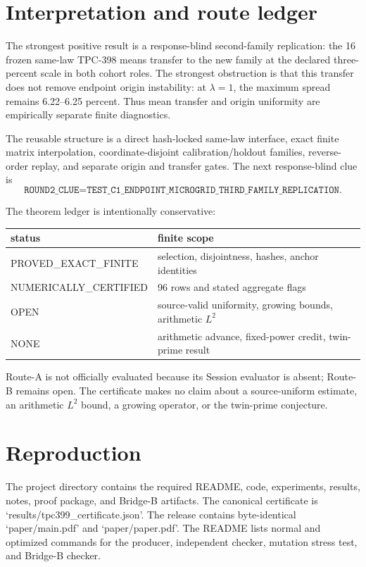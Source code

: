 \documentclass[10pt]{article}
\begin{document}
\section{Interpretation and route ledger}

The strongest positive result is a response-blind second-family replication:
the 16 frozen same-law TPC-398 means transfer to the new family at the
declared three-percent scale in both cohort roles.  The strongest obstruction
is that this transfer does not remove endpoint origin instability: at
$\lambda=1$, the maximum spread remains 6.22--6.25 percent.  Thus mean
transfer and origin uniformity are empirically separate finite diagnostics.

The reusable structure is a direct hash-locked same-law interface, exact finite
matrix interpolation, coordinate-disjoint calibration/holdout families,
reverse-order replay, and separate origin and transfer gates.  The next
response-blind clue is
\[
 \texttt{ROUND2\_CLUE=TEST\_C1\_ENDPOINT\_MICROGRID\_THIRD\_FAMILY\_REPLICATION}.
\]

The theorem ledger is intentionally conservative:
\begin{center}
\begin{tabular}{@{}ll@{}}
\toprule
status & finite scope\\
\midrule
PROVED\_EXACT\_FINITE & selection, disjointness, hashes, anchor identities\\
NUMERICALLY\_CERTIFIED & 96 rows and stated aggregate flags\\
OPEN & source-valid uniformity, growing bounds, arithmetic $L^2$\\
NONE & arithmetic advance, fixed-power credit, twin-prime result\\
\bottomrule
\end{tabular}
\end{center}
Route-A is not officially evaluated because its Session evaluator is absent;
Route-B remains open.  The certificate makes no claim about a source-uniform
estimate, an arithmetic $L^2$ bound, a growing operator, or the twin-prime
conjecture.

\section*{Reproduction}

The project directory contains the required README, code, experiments, results,
notes, proof package, and Bridge-B artifacts.  The canonical certificate is
`results/tpc399\_certificate.json'.  The release contains byte-identical
`paper/main.pdf' and `paper/paper.pdf'.  The README lists normal and optimized
commands for the producer, independent checker, mutation stress test, and
Bridge-B checker.
\end{document}
